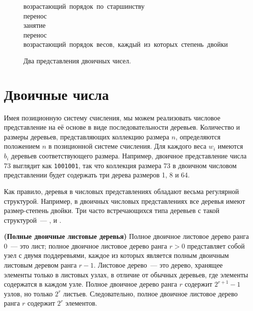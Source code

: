 \begin{figure}
  \centering
  
  \mbox{возрастающий порядок по старшинству}\\
  \mbox{перенос}\\
  \mbox{занятие}\\
  \mbox{перенос}\\
  \mbox{возрастающий порядок весов, каждый из которых степень двойки}\\

  \caption{Два представления двоичных чисел.}
  \label{fig:9.1}
\end{figure}

\section{Двоичные числа}
\label{sc:9.2}

Имея позиционную систему счисления, мы можем реализовать числовое
представление на её основе в виде последовательности
деревьев. Количество и размеры деревьев, представляющих коллекцию
размера $n$, определяются положением $n$ в позиционной системе
счисления. Для каждого веса $w_i$ имеются $b_i$ деревьев
соответствующего размера. Например, двоичное представление числа 73
выглядит как \texttt{1001001}, так что коллекция размера 73 в двоичном
числовом представлении будет содержать три дерева размеров 1, 8 и 64.

Как правило, деревья в числовых представлениях обладают весьма
регулярной структурой. Например, в двоичных числовых представлениях
все деревья имеют размер-степень двойки. Три часто встречающихся типа
деревьев с такой структурой~---  \cite{KaldewaijDielissen1996},  \cite{Vuillemin1978} и
 \cite{SackStrothotte1990}.

\begin{definition}
  \textbf{(Полные двоичные листовые деревья)} Полное двоичное листовое
  дерево ранга 0~--- это лист; полное двоичное листовое дерево ранга
  $r > 0$ представляет собой узел с двумя поддеревьями, каждое из
  которых является полным двоичным листовым деревом ранга $r -
  1$. Листовое дерево~--- это дерево, хранящее элементы только в
  листовых узлах, в отличие от обычных деревьев, где элементы
  содержатся в каждом узле. Полное двоичное дерево ранга $r$ содержит
  $2^{r+1} - 1$ узлов, но только $2^r$ листьев. Следовательно, полное
  двоичное листовое дерево ранга $r$ содержит $2^r$ элементов.
\end{definition}

